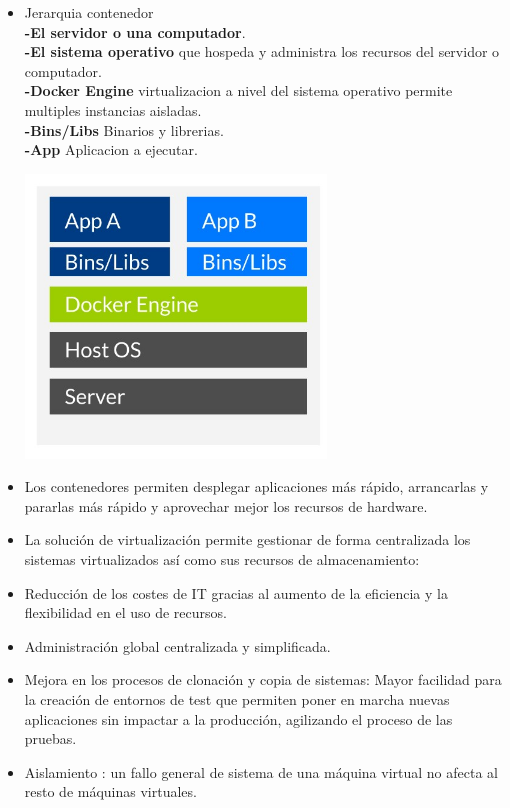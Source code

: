 \begin{itemize}
	\item Jerarquia contenedor
	\\ \textbf{-El servidor o una computador}.
	\\ \textbf{-El sistema operativo} que hospeda y administra los recursos del servidor o computador.
	\\ \textbf{-Docker Engine} virtualizacion a nivel del sistema operativo permite multiples instancias aisladas.
	\\ \textbf{-Bins/Libs} Binarios y librerias.
	\\ \textbf{-App} Aplicacion a ejecutar.
	\begin{center}
	\includegraphics[width=8cm]{./Imagenes/jerarquia2} 
	\end{center}
\end{itemize} 

\begin{itemize}
	\item Los contenedores permiten desplegar aplicaciones más rápido, arrancarlas y pararlas más rápido y aprovechar mejor los recursos de hardware.
	\item La solución de virtualización permite gestionar de forma centralizada los sistemas virtualizados así como sus recursos de almacenamiento:
	\item Reducción de los costes de IT gracias al aumento de la eficiencia y la flexibilidad en el uso de recursos.
	\item Administración global centralizada y simplificada.
	\item Mejora en los procesos de clonación y copia de sistemas: Mayor facilidad para la creación de entornos de test que permiten poner en marcha nuevas aplicaciones sin impactar a la producción, agilizando el proceso de las pruebas.
	\item Aislamiento : un fallo general de sistema de una máquina virtual no afecta al resto de máquinas virtuales.



\end{itemize} 